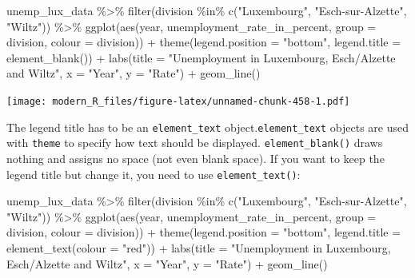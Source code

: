 \documentclass[
]{article}
\newenvironment{Shaded}{\begin{snugshade}}{\end{snugshade}}
\newcommand{\AttributeTok}[1]{\textcolor[rgb]{0.77,0.63,0.00}{#1}}
\newcommand{\FunctionTok}[1]{\textcolor[rgb]{0.00,0.00,0.00}{#1}}
\newcommand{\NormalTok}[1]{#1}
\newcommand{\SpecialCharTok}[1]{\textcolor[rgb]{0.00,0.00,0.00}{#1}}
\newcommand{\StringTok}[1]{\textcolor[rgb]{0.31,0.60,0.02}{#1}}
\begin{document}
\begin{Shaded}
\begin{Highlighting}[]
\NormalTok{unemp\_lux\_data }\SpecialCharTok{\%\textgreater{}\%}
  \FunctionTok{filter}\NormalTok{(division }\SpecialCharTok{\%in\%} \FunctionTok{c}\NormalTok{(}\StringTok{"Luxembourg"}\NormalTok{, }\StringTok{"Esch{-}sur{-}Alzette"}\NormalTok{, }\StringTok{"Wiltz"}\NormalTok{)) }\SpecialCharTok{\%\textgreater{}\%}
  \FunctionTok{ggplot}\NormalTok{(}\FunctionTok{aes}\NormalTok{(year, unemployment\_rate\_in\_percent, }\AttributeTok{group =}\NormalTok{ division, }\AttributeTok{colour =}\NormalTok{ division)) }\SpecialCharTok{+}
  \FunctionTok{theme}\NormalTok{(}\AttributeTok{legend.position =} \StringTok{"bottom"}\NormalTok{, }\AttributeTok{legend.title =} \FunctionTok{element\_blank}\NormalTok{()) }\SpecialCharTok{+}
  \FunctionTok{labs}\NormalTok{(}\AttributeTok{title =} \StringTok{"Unemployment in Luxembourg, Esch/Alzette and Wiltz"}\NormalTok{, }\AttributeTok{x =} \StringTok{"Year"}\NormalTok{, }\AttributeTok{y =} \StringTok{"Rate"}\NormalTok{) }\SpecialCharTok{+}
  \FunctionTok{geom\_line}\NormalTok{()}
\end{Highlighting}
\end{Shaded}

\texttt{[image: modern\_R\_files/figure-latex/unnamed-chunk-458-1.pdf]}

The legend title has to be an \texttt{element\_text} object.\texttt{element\_text} objects are used with \texttt{theme} to
specify how text should be displayed. \texttt{element\_blank()} draws nothing and assigns no space (not
even blank space). If you want to keep the legend title but change it, you need to use \texttt{element\_text()}:

\begin{Shaded}
\begin{Highlighting}[]
\NormalTok{unemp\_lux\_data }\SpecialCharTok{\%\textgreater{}\%}
  \FunctionTok{filter}\NormalTok{(division }\SpecialCharTok{\%in\%} \FunctionTok{c}\NormalTok{(}\StringTok{"Luxembourg"}\NormalTok{, }\StringTok{"Esch{-}sur{-}Alzette"}\NormalTok{, }\StringTok{"Wiltz"}\NormalTok{)) }\SpecialCharTok{\%\textgreater{}\%}
  \FunctionTok{ggplot}\NormalTok{(}\FunctionTok{aes}\NormalTok{(year, unemployment\_rate\_in\_percent, }\AttributeTok{group =}\NormalTok{ division, }\AttributeTok{colour =}\NormalTok{ division)) }\SpecialCharTok{+}
  \FunctionTok{theme}\NormalTok{(}\AttributeTok{legend.position =} \StringTok{"bottom"}\NormalTok{, }\AttributeTok{legend.title =} \FunctionTok{element\_text}\NormalTok{(}\AttributeTok{colour =} \StringTok{"red"}\NormalTok{)) }\SpecialCharTok{+}
  \FunctionTok{labs}\NormalTok{(}\AttributeTok{title =} \StringTok{"Unemployment in Luxembourg, Esch/Alzette and Wiltz"}\NormalTok{, }\AttributeTok{x =} \StringTok{"Year"}\NormalTok{, }\AttributeTok{y =} \StringTok{"Rate"}\NormalTok{) }\SpecialCharTok{+}
  \FunctionTok{geom\_line}\NormalTok{()}
\end{Highlighting}
\end{Shaded}
\end{document}
